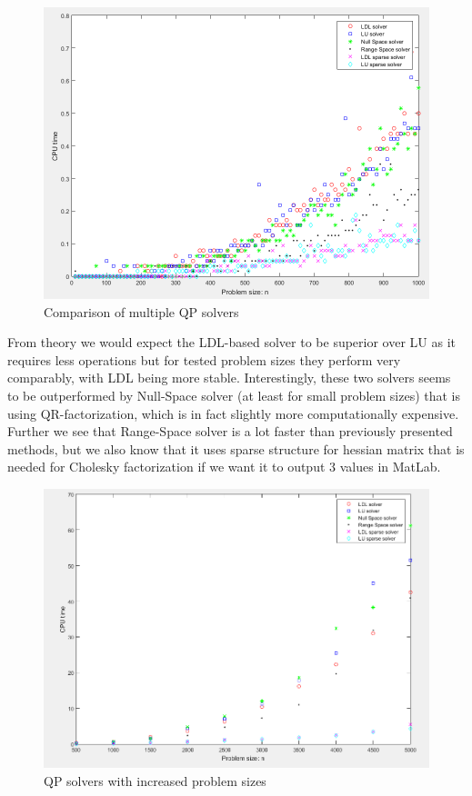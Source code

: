 \begin{figure}[ht!]
    \centering
    \includegraphics[width=\textwidth]{fig/all_solvers.PNG}
    \caption{Comparison of multiple QP solvers}
    \label{fig:all_solvers}
\end{figure}
From theory we would expect the LDL-based solver to be superior over LU as it requires less operations but for tested problem sizes they perform very comparably, with LDL being more stable. Interestingly, these two solvers seems to be outperformed by Null-Space solver (at least for small problem sizes) that is using QR-factorization, which is in fact slightly more computationally expensive. Further we see that Range-Space solver is a lot faster than previously presented methods, but we also know that it uses sparse structure for hessian matrix that is needed for Cholesky factorization if we want it to output 3 values in MatLab.

\begin{figure}[ht!]
    \centering
    \includegraphics[width=\textwidth]{fig/bigger_prob.PNG}
    \caption{QP solvers with increased problem sizes}
    \label{fig:bigger_prob}
\end{figure}

